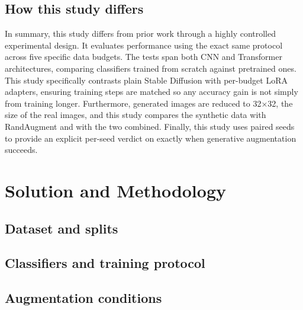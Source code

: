 \documentclass{scrartcl}
\begin{document}
\subsection{How this study differs}
In summary, this study differs from prior work through a highly controlled experimental design. It evaluates performance using the exact same protocol across five specific data budgets. The tests span both CNN and Transformer architectures, comparing classifiers trained from scratch against pretrained ones. This study specifically contrasts plain Stable Diffusion with per-budget LoRA adapters, ensuring training steps are matched so any accuracy gain is not simply from training longer. Furthermore, generated images are reduced to 32×32, the size of the real images, and this study compares the synthetic data with RandAugment and with the two combined. Finally, this study uses paired seeds to provide an explicit per-seed verdict on exactly when generative augmentation succeeds.

\section{Solution and Methodology}

\subsection{Dataset and splits}

\subsection{Classifiers and training protocol}

\subsection{Augmentation conditions}
\end{document}
